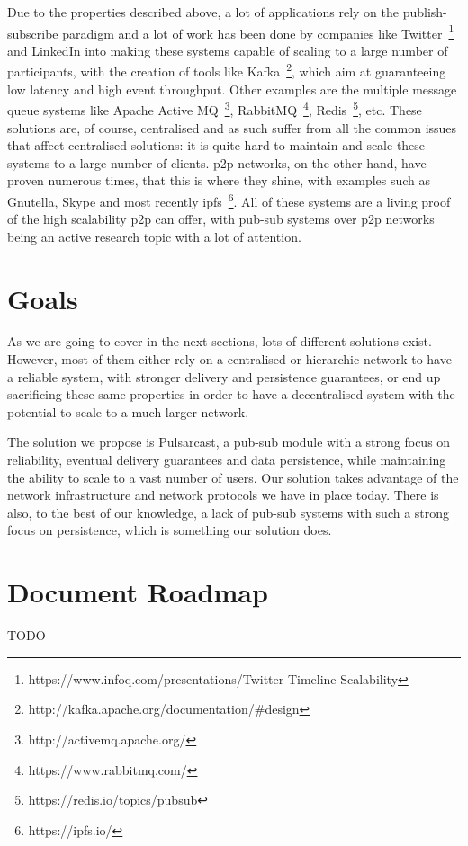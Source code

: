 Due to the properties described above, a lot of applications rely on the
publish-subscribe paradigm and a lot of work has been done by companies like
Twitter~\footnote{https://www.infoq.com/presentations/Twitter-Timeline-Scalability}
and LinkedIn into making these systems capable of scaling to a large number of
participants, with the creation of tools like
Kafka~\footnote{http://kafka.apache.org/documentation/\#design}, which aim at
guaranteeing low latency and high event throughput. Other examples are the
multiple message queue systems like Apache Active
MQ~\footnote{http://activemq.apache.org/},
RabbitMQ~\footnote{https://www.rabbitmq.com/},
Redis~\footnote{https://redis.io/topics/pubsub}, etc.  These solutions are, of
course, centralised and as such suffer from all the common issues that affect
centralised solutions: it is quite hard to maintain and scale these systems to
a large number of clients. \acrfull{p2p} networks, on the other hand, have
proven numerous times, that this is where they shine, with examples such as
Gnutella, Skype and most recently \acrshort{ipfs}~\footnote{https://ipfs.io/}.
All of these systems are a living proof of the high scalability \acrshort{p2p} can offer,
with pub-sub systems over \acrshort{p2p} networks being an active research topic with a
lot of attention.

\section{Goals}

As we are going to cover in the next sections, lots of different
solutions exist. However, most of them either rely on a
centralised or hierarchic network to have a reliable system, with
stronger delivery and persistence guarantees, or end up sacrificing
these same properties in order to have a decentralised system with the
potential to scale to a much larger network.

The solution we propose is Pulsarcast, a pub-sub module with a strong focus on
reliability, eventual delivery guarantees and data persistence, while
maintaining the ability to scale to a vast number of users. Our solution takes
advantage of the network infrastructure and network protocols we have in place
today. There is also, to the best of our knowledge, a lack of pub-sub systems
with such a strong focus on persistence, which is something our solution does.

\section{Document Roadmap}

TODO
